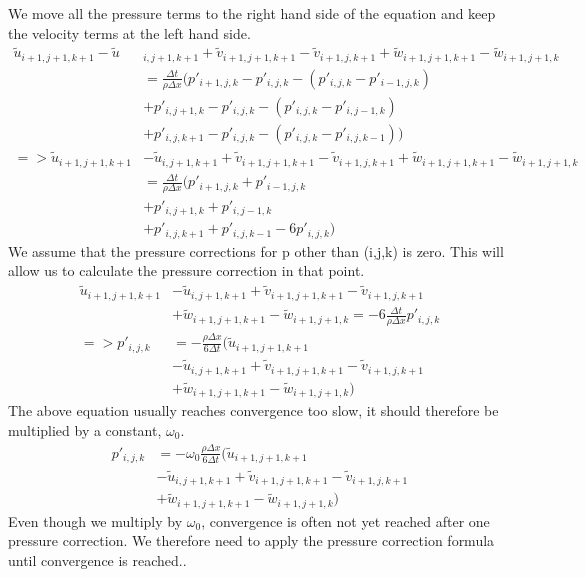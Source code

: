 \documentclass{article}
\begin{document}
We move all the pressure terms to the right hand side of the equation and keep the velocity terms at the left hand side.
\[
  \begin{split}
    \tilde{u}_{i+1,j+1,k+1}-\tilde{u}&_{i, j+1, k+1}
    +\tilde{v}_{i+1,j+1,k+1}-\tilde{v}_{i+1, j, k+1}
    +\tilde{w}_{i+1,j+1,k+1}
    -\tilde{w}_{i+1, j+1, k}\\
    &=\frac{\Delta t}{\rho \Delta x}(p'_{i+1,j,k}-p'_{i,j,k} - (p'_{i,j,k}-p'_{i-1,j,k})\\
    &+p'_{i,j+1,k}-p'_{i,j,k}-(p'_{i,j,k}-p'_{i,j-1,k})\\
    &+p'_{i,j,k+1}-p'_{i,j,k}- (p'_{i,j,k}-p'_{i,j,k-1}))\\
    =>\tilde{u}_{i+1,j+1,k+1}&-\tilde{u}_{i, j+1, k+1}
    +\tilde{v}_{i+1,j+1,k+1}-\tilde{v}_{i+1, j, k+1}
    +\tilde{w}_{i+1,j+1,k+1}
    -\tilde{w}_{i+1, j+1, k}\\
    &=\frac{\Delta t}{\rho \Delta x}(p'_{i+1,j,k} + p'_{i-1,j,k}\\
    &+p'_{i,j+1,k}+p'_{i,j-1,k}\\
    &+p'_{i,j,k+1}+p'_{i,j,k-1} - 6 p'_{i,j,k})
  \end{split}
\]
We assume that the pressure corrections for p other than (i,j,k) is zero. This will allow us to calculate the pressure correction in that point.\cite{MAC}
\[
  \begin{split}
  \tilde{u}_{i+1,j+1,k+1}&-\tilde{u}_{i, j+1, k+1}
    +\tilde{v}_{i+1,j+1,k+1}-\tilde{v}_{i+1, j, k+1}
    \\ &+\tilde{w}_{i+1,j+1,k+1}
    -\tilde{w}_{i+1, j+1, k}
     =-6\frac{\Delta t}{\rho \Delta x}p'_{i,j,k}\\
      =>p'_{i,j,k}&=-\frac{\rho \Delta x}{6\Delta t}(\tilde{u}_{i+1,j+1,k+1} \\ &-\tilde{u}_{i, j+1, k+1}
    +\tilde{v}_{i+1,j+1,k+1}-\tilde{v}_{i+1, j, k+1}
    \\ &+\tilde{w}_{i+1,j+1,k+1}
    -\tilde{w}_{i+1, j+1, k})
  \end{split}
\]
The above equation usually reaches convergence too slow, it should therefore be multiplied by a constant, \(\omega _0\).
\begin{equation}
\begin{split}
  p'_{i,j,k}&=-\omega _0\frac{\rho \Delta x}{6\Delta t}(\tilde{u}_{i+1,j+1,k+1}
  \\ &-\tilde{u}_{i, j+1, k+1}
  +\tilde{v}_{i+1,j+1,k+1}-\tilde{v}_{i+1, j, k+1}
  \\ &+\tilde{w}_{i+1,j+1,k+1}
  -\tilde{w}_{i+1, j+1, k})
\end{split} \label{pressure correction formula}
\end{equation}
Even though we multiply by \(\omega _0\), convergence is often not yet reached after one pressure correction. We therefore need to apply the pressure correction formula until convergence is reached.\cite{MAC}. 
\end{document}
